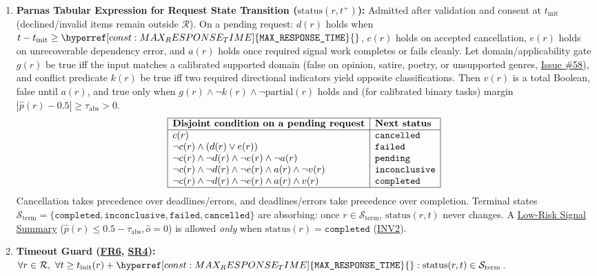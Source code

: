 \documentclass[11pt]{article}
\newcommand{\MaxResponseTime}{\hyperref[const:MAX_RESPONSE_TIME]{\texttt{MAX\_\allowbreak{}RESPONSE\_\allowbreak{}TIME}}}
\newcommand{\TermLowRisk}{\hyperlink{gls-lowrisk}{Low-Risk Signal Summary}}
\begin{document}
\begin{enumerate}[leftmargin=*]
    \item \textbf{Parnas Tabular Expression for Request State Transition ($\text{status}(r,t^+)$):} Admitted after validation and consent at $t_{\mathrm{init}}$ (declined/invalid items remain outside $\mathcal{R}$). On a pending request: $d(r)$ holds when $t - t_{\mathrm{init}} \ge \MaxResponseTime{}$, $c(r)$ holds on accepted cancellation, $e(r)$ holds on unrecoverable dependency error, and $a(r)$ holds once required signal work completes or fails cleanly. Let domain/applicability gate $g(r)$ be true iff the input matches a calibrated supported domain (false on opinion, satire, poetry, or unsupported genres, \href{https://github.com/richy1337/Verity/issues/58}{Issue \#58}), and conflict predicate $k(r)$ be true iff two required directional indicators yield opposite classifications. Then $v(r)$ is a total Boolean, false until $a(r)$, and true only when $g(r) \land \neg k(r) \land \neg \text{partial}(r)$ holds and (for calibrated binary tasks) margin $|\hat p(r)-0.5| \ge \tau_{\mathrm{abs}} > 0$.
    \begingroup\small
    \[
    \begin{array}{|l|l|}
    \hline
    \textbf{Disjoint condition on a pending request} & \textbf{Next status}\\
    \hline
    c(r) & \texttt{cancelled}\\
    \neg c(r)\land(d(r)\lor e(r)) & \texttt{failed}\\
    \neg c(r)\land\neg d(r)\land\neg e(r)\land\neg a(r) & \texttt{pending}\\
    \neg c(r)\land\neg d(r)\land\neg e(r)\land a(r)\land\neg v(r) & \texttt{inconclusive}\\
    \neg c(r)\land\neg d(r)\land\neg e(r)\land a(r)\land v(r) & \texttt{completed}\\
    \hline
    \end{array}
    \]
    \endgroup
    Cancellation takes precedence over deadlines/errors, and deadlines/errors take precedence over completion. Terminal states $\mathcal{S}_{\text{term}} = \{\texttt{completed},\allowbreak\texttt{inconclusive},\allowbreak\texttt{failed},\allowbreak\texttt{cancelled}\}$ are absorbing: once $r \in \mathcal{S}_{\text{term}}$, $\text{status}(r, t)$ never changes. A \TermLowRisk{} ($\hat{p}(r) \le 0.5 - \tau_{\text{abs}}, \hat{o}=0$) is allowed \emph{only} when $\text{status}(r) = \texttt{completed}$ (\hyperref[INV2]{INV2}).
    \item \textbf{Timeout Guard (\hyperref[FR6]{FR6}, \hyperref[SR4]{SR4}):} $\forall r \in \mathcal{R},\ \forall t \ge t_{\text{init}}(r) + \MaxResponseTime{} : \text{status}(r, t) \in \mathcal{S}_{\text{term}}$.

\end{enumerate}
\end{document}
